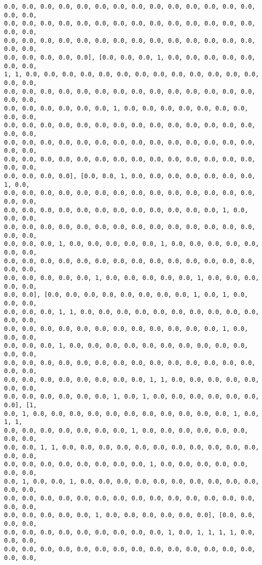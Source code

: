 \documentclass[11pt]{article}
\begin{document}
\begin{Verbatim}[commandchars=\\\{\}]
0.0, 0.0, 0.0, 0.0, 0.0, 0.0, 0.0, 0.0, 0.0, 0.0, 0.0, 0.0, 0.0, 0.0, 0.0, 0.0,
0.0, 0.0, 0.0, 0.0, 0.0, 0.0, 0.0, 0.0, 0.0, 0.0, 0.0, 0.0, 0.0, 0.0, 0.0, 0.0,
0.0, 0.0, 0.0, 0.0, 0.0, 0.0, 0.0, 0.0, 0.0, 0.0, 0.0, 0.0, 0.0, 0.0, 0.0, 0.0,
0.0, 0.0, 0.0, 0.0, 0.0], [0.0, 0.0, 0.0, 1, 0.0, 0.0, 0.0, 0.0, 0.0, 0.0, 0.0,
1, 1, 0.0, 0.0, 0.0, 0.0, 0.0, 0.0, 0.0, 0.0, 0.0, 0.0, 0.0, 0.0, 0.0, 0.0, 0.0,
0.0, 0.0, 0.0, 0.0, 0.0, 0.0, 0.0, 0.0, 0.0, 0.0, 0.0, 0.0, 0.0, 0.0, 0.0, 0.0,
0.0, 0.0, 0.0, 0.0, 0.0, 0.0, 1, 0.0, 0.0, 0.0, 0.0, 0.0, 0.0, 0.0, 0.0, 0.0,
0.0, 0.0, 0.0, 0.0, 0.0, 0.0, 0.0, 0.0, 0.0, 0.0, 0.0, 0.0, 0.0, 0.0, 0.0, 0.0,
0.0, 0.0, 0.0, 0.0, 0.0, 0.0, 0.0, 0.0, 0.0, 0.0, 0.0, 0.0, 0.0, 0.0, 0.0, 0.0,
0.0, 0.0, 0.0, 0.0, 0.0, 0.0, 0.0, 0.0, 0.0, 0.0, 0.0, 0.0, 0.0, 0.0, 0.0, 0.0,
0.0, 0.0, 0.0, 0.0], [0.0, 0.0, 1, 0.0, 0.0, 0.0, 0.0, 0.0, 0.0, 0.0, 1, 0.0,
0.0, 0.0, 0.0, 0.0, 0.0, 0.0, 0.0, 0.0, 0.0, 0.0, 0.0, 0.0, 0.0, 0.0, 0.0, 0.0,
0.0, 0.0, 0.0, 0.0, 0.0, 0.0, 0.0, 0.0, 0.0, 0.0, 0.0, 0.0, 1, 0.0, 0.0, 0.0,
0.0, 0.0, 0.0, 0.0, 0.0, 0.0, 0.0, 0.0, 0.0, 0.0, 0.0, 0.0, 0.0, 0.0, 0.0, 0.0,
0.0, 0.0, 0.0, 1, 0.0, 0.0, 0.0, 0.0, 0.0, 1, 0.0, 0.0, 0.0, 0.0, 0.0, 0.0, 0.0,
0.0, 0.0, 0.0, 0.0, 0.0, 0.0, 0.0, 0.0, 0.0, 0.0, 0.0, 0.0, 0.0, 0.0, 0.0, 0.0,
0.0, 0.0, 0.0, 0.0, 0.0, 1, 0.0, 0.0, 0.0, 0.0, 0.0, 1, 0.0, 0.0, 0.0, 0.0, 0.0,
0.0, 0.0], [0.0, 0.0, 0.0, 0.0, 0.0, 0.0, 0.0, 0.0, 1, 0.0, 1, 0.0, 0.0, 0.0,
0.0, 0.0, 0.0, 1, 1, 0.0, 0.0, 0.0, 0.0, 0.0, 0.0, 0.0, 0.0, 0.0, 0.0, 0.0, 0.0,
0.0, 0.0, 0.0, 0.0, 0.0, 0.0, 0.0, 0.0, 0.0, 0.0, 0.0, 0.0, 1, 0.0, 0.0, 0.0,
0.0, 0.0, 0.0, 1, 0.0, 0.0, 0.0, 0.0, 0.0, 0.0, 0.0, 0.0, 0.0, 0.0, 0.0, 0.0,
0.0, 0.0, 0.0, 0.0, 0.0, 0.0, 0.0, 0.0, 0.0, 0.0, 0.0, 0.0, 0.0, 0.0, 0.0, 0.0,
0.0, 0.0, 0.0, 0.0, 0.0, 0.0, 0.0, 0.0, 1, 1, 0.0, 0.0, 0.0, 0.0, 0.0, 0.0, 0.0,
0.0, 0.0, 0.0, 0.0, 0.0, 0.0, 1, 0.0, 1, 0.0, 0.0, 0.0, 0.0, 0.0, 0.0, 0.0], [1,
0.0, 1, 0.0, 0.0, 0.0, 0.0, 0.0, 0.0, 0.0, 0.0, 0.0, 0.0, 0.0, 1, 0.0, 1, 1,
0.0, 0.0, 0.0, 0.0, 0.0, 0.0, 0.0, 1, 0.0, 0.0, 0.0, 0.0, 0.0, 0.0, 0.0, 0.0,
0.0, 0.0, 1, 1, 0.0, 0.0, 0.0, 0.0, 0.0, 0.0, 0.0, 0.0, 0.0, 0.0, 0.0, 0.0, 0.0,
0.0, 0.0, 0.0, 0.0, 0.0, 0.0, 0.0, 0.0, 1, 0.0, 0.0, 0.0, 0.0, 0.0, 0.0, 0.0,
0.0, 1, 0.0, 0.0, 1, 0.0, 0.0, 0.0, 0.0, 0.0, 0.0, 0.0, 0.0, 0.0, 0.0, 0.0, 0.0,
0.0, 0.0, 0.0, 0.0, 0.0, 0.0, 0.0, 0.0, 0.0, 0.0, 0.0, 0.0, 0.0, 0.0, 0.0, 0.0,
0.0, 0.0, 0.0, 0.0, 0.0, 1, 0.0, 0.0, 0.0, 0.0, 0.0, 0.0], [0.0, 0.0, 0.0, 0.0,
0.0, 0.0, 0.0, 0.0, 0.0, 0.0, 0.0, 0.0, 0.0, 1, 0.0, 1, 1, 1, 1, 0.0, 0.0, 0.0,
0.0, 0.0, 0.0, 0.0, 0.0, 0.0, 0.0, 0.0, 0.0, 0.0, 0.0, 0.0, 0.0, 0.0, 0.0, 0.0,

\end{Verbatim}
\end{document}
